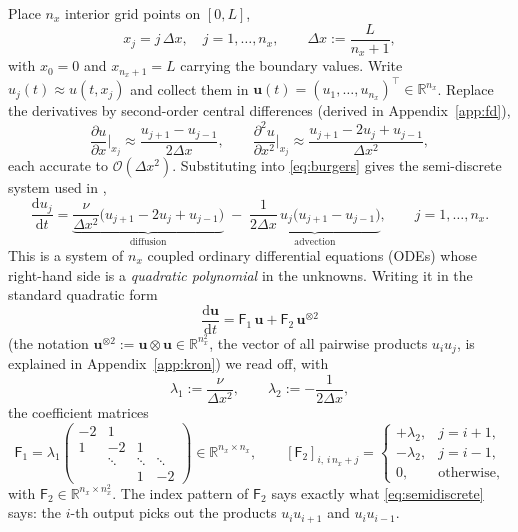 \documentclass[11pt,a4paper]{article}
\theoremstyle{plain}
\theoremstyle{definition}
\theoremstyle{remark}
\newcommand{\R}{\mathbb{R}}
\newcommand{\Oh}{\mathcal{O}}
\newcommand{\dd}{\mathrm{d}}
\newcommand{\uvec}{\bm{u}}
\newcommand{\Fone}{\mathsf{F}_1}
\newcommand{\Ftwo}{\mathsf{F}_2}
\begin{document}
Place $n_x$ interior grid points on $[0,L]$,
\begin{equation}
x_j = j\,\Delta x,\quad j=1,\dots,n_x,
\qquad \Delta x := \frac{L}{n_x+1},
\end{equation}
with $x_0=0$ and $x_{n_x+1}=L$ carrying the boundary values.  Write
$u_j(t)\approx u(t,x_j)$ and collect them in
$\uvec(t)=(u_1,\dots,u_{n_x})^{\!\top}\in\R^{n_x}$.  Replace the derivatives by
second-order central differences (derived in Appendix~\ref{app:fd}),
\begin{equation}
\frac{\partial u}{\partial x}\Big|_{x_j}\!\approx\frac{u_{j+1}-u_{j-1}}{2\Delta x},
\qquad
\frac{\partial^2u}{\partial x^2}\Big|_{x_j}\!\approx
\frac{u_{j+1}-2u_j+u_{j-1}}{\Delta x^2},
\label{eq:stencils}
\end{equation}
each accurate to $\Oh(\Delta x^2)$.  Substituting into \eqref{eq:burgers} gives
the semi-discrete system used in \cite[Eq.~(F.2)]{Setty2026},
\begin{equation}
\frac{\dd u_j}{\dd t}
= \underbrace{\frac{\nu}{\Delta x^{2}}\bigl(u_{j+1}-2u_j+u_{j-1}\bigr)}_{\text{diffusion}}
\;-\;\underbrace{\frac{1}{2\Delta x}\,u_j\bigl(u_{j+1}-u_{j-1}\bigr)}_{\text{advection}},
\qquad j=1,\dots,n_x .
\label{eq:semidiscrete}
\end{equation}
This is a system of $n_x$ coupled ordinary differential equations (ODEs) whose
right-hand side is a \emph{quadratic polynomial} in the unknowns.  Writing it in
the standard quadratic form
\begin{equation}
\boxed{\ \frac{\dd\uvec}{\dd t} = \Fone\,\uvec + \Ftwo\,\uvec^{\otimes2}\ }
\label{eq:quadode}
\end{equation}
(the notation $\uvec^{\otimes2}:=\uvec\otimes\uvec\in\R^{n_x^2}$, the vector of
all pairwise products $u_iu_j$, is explained in Appendix~\ref{app:kron}) we
read off, with
\begin{equation}
\lambda_1 := \frac{\nu}{\Delta x^{2}},
\qquad
\lambda_2 := -\frac{1}{2\Delta x},
\end{equation}
the coefficient matrices \cite[Eqs.~(F.3)--(F.4)]{Setty2026}
\begin{equation}
\Fone=\lambda_1\!
\begin{pmatrix}
-2 & 1 & & \\
1 & -2 & 1 & \\
& \ddots&\ddots&\ddots\\
& & 1 & -2
\end{pmatrix}\in\R^{n_x\times n_x},
\qquad
[\Ftwo]_{i,\,i\,n_x+j}=
\begin{cases}
+\lambda_2, & j=i+1,\\
-\lambda_2, & j=i-1,\\
0,&\text{otherwise,}
\end{cases}
\label{eq:F1F2}
\end{equation}
with $\Ftwo\in\R^{n_x\times n_x^2}$.  The index pattern of $\Ftwo$ says exactly
what \eqref{eq:semidiscrete} says: the $i$-th output picks out the products
$u_iu_{i+1}$ and $u_iu_{i-1}$.
\end{document}
